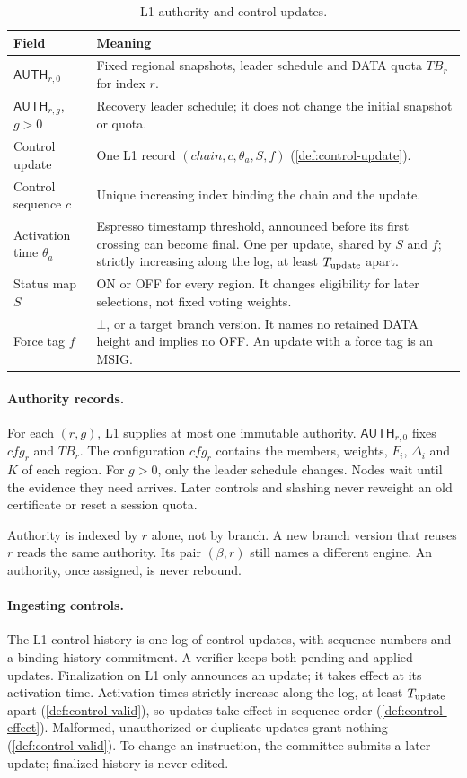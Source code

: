 \documentclass[11pt,a4paper]{article}
\newcommand{\TB}{\mathit{TB}}
\newcommand{\tagg}[1]{\ensuremath{\mathsf{#1}}}
\begin{document}
\begin{table}[htbp]\centering\small
\caption{L1 authority and control updates.}\label{tab:l1}
\begin{tabularx}{\linewidth}{@{}p{.27\linewidth}Y@{}}\toprule
Field & Meaning\\\midrule
$\tagg{AUTH}_{r,0}$ & Fixed regional snapshots, leader schedule and
DATA quota $\TB_r$ for index $r$.\\
$\tagg{AUTH}_{r,g}$, $g>0$ & Recovery leader schedule; it does not
change the initial snapshot or quota.\\
Control update & One L1 record $(\mathit{chain},c,\theta_a,S,f)$
(\cref{def:control-update}).\\
Control sequence $c$ & Unique increasing index binding the chain and the
update.\\
Activation time $\theta_a$ & Espresso timestamp threshold, announced
before its first crossing can become final. One per update, shared by
$S$ and $f$; strictly increasing along the log, at least
$T_{\rm update}$ apart.\\
Status map $S$ & ON or OFF for every region. It changes eligibility for
later selections, not fixed voting weights.\\
Force tag $f$ & $\bot$, or a target branch version. It names no retained
DATA height and implies no OFF. An update with a force tag is an
MSIG.\\\bottomrule
\end{tabularx}
\end{table}

\paragraph{Authority records.}
For each $(r,g)$, L1 supplies at most one immutable authority.
$\tagg{AUTH}_{r,0}$ fixes $\mathit{cfg}_r$ and $\TB_r$. The configuration
$\mathit{cfg}_r$ contains the members, weights, $F_i$, $\Delta_i$ and $K$
of each region. For $g>0$, only the leader schedule changes. Nodes wait
until the evidence they need arrives. Later controls and slashing never
reweight an old certificate or reset a session quota.

Authority is indexed by $r$ alone, not by branch. A new branch version
that reuses $r$ reads the same authority. Its pair $(\beta,r)$ still
names a different engine. An authority, once assigned, is never
rebound.

\paragraph{Ingesting controls.}
The L1 control history is one log of control updates, with sequence
numbers and a binding history commitment. A verifier keeps both pending
and applied updates. Finalization on L1 only announces an update; it
takes effect at its activation time. Activation times strictly increase
along the log, at least $T_{\rm update}$ apart (\cref{def:control-valid}),
so updates take effect in sequence order (\cref{def:control-effect}). Malformed, unauthorized or duplicate updates
grant nothing (\cref{def:control-valid}). To change an instruction, the
committee submits a later update; finalized history is never edited.
\end{document}

